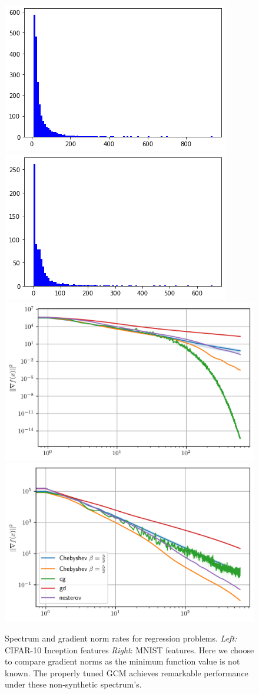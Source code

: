 \documentclass{article}
\begin{document}
\begin{figure}[h]
    \centering
    \includegraphics[width=5 cm]{imgs/inception/spectrum.png}\includegraphics[width= 5 cm]{imgs/mnist/spectrum.png}
    \includegraphics[width=5 cm]{new_imgs/inception.png}\includegraphics[width= 5 cm]{new_imgs/mnist.png}
    
    
    \caption{Spectrum and gradient norm rates for regression problems. \textit{Left:} CIFAR-10 Inception features \textit{Right}: MNIST features. Here we choose to compare gradient norms as the minimum function value is not known. The properly tuned GCM achieves remarkable performance under these non-synthetic spectrum's.
}
    \label{fig:my_label}
\end{figure}
\end{document}
